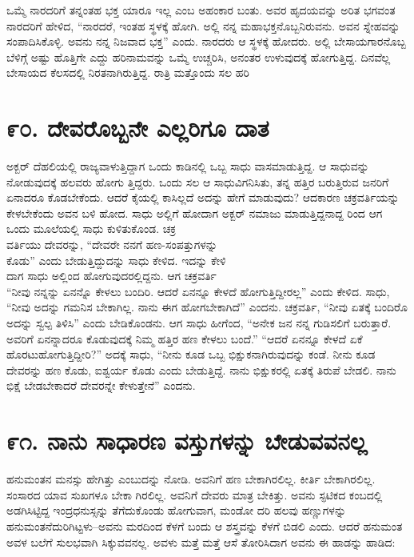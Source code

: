ಒಮ್ಮೆ ನಾರದರಿಗೆ ತನ್ನಂತಹ ಭಕ್ತ ಯಾರೂ ಇಲ್ಲ ಎಂಬ ಅಹಂಕಾರ ಬಂತು. ಅವರ ಹೃದಯವನ್ನು ಅರಿತ ಭಗವಂತ ನಾರದರಿಗೆ ಹೇಳಿದ, “ನಾರದರೆ, ಇಂತಹ ಸ್ಥಳಕ್ಕೆ ಹೋಗಿ. ಅಲ್ಲಿ ನನ್ನ ಮಹಾಭಕ್ತನೊಬ್ಬನಿರುವನು. ಅವನ ಸ್ನೇಹವನ್ನು ಸಂಪಾದಿಸಿಕೊಳ್ಳಿ. ಅವನು ನನ್ನ ನಿಜವಾದ ಭಕ್ತ” ಎಂದು. ನಾರದರು ಆ ಸ್ಥಳಕ್ಕೆ ಹೋದರು. ಅಲ್ಲಿ ಬೇಸಾಯಗಾರನೊಬ್ಬ ಬೆಳಿಗ್ಗೆ ಅಷ್ಟು ಹೊತ್ತಿಗೇ ಎದ್ದು ಹರಿನಾಮವನ್ನು ಒಮ್ಮೆ ಉಚ್ಚರಿಸಿ, ಅನಂತರ ಉಳುವುದಕ್ಕೆ ಹೋಗುತ್ತಿದ್ದ. ದಿನವೆಲ್ಲ ಬೇಸಾಯದ ಕೆಲಸದಲ್ಲಿ ನಿರತನಾಗಿರುತ್ತಿದ್ದ. ರಾತ್ರಿ ಮತ್ತೊಂದು ಸಲ ಹರಿ



\section{\num{೯೦. } ದೇವರೊಬ್ಬನೇ ಎಲ್ಲರಿಗೂ ದಾತ}

ಅಕ್ಬರ್ ದೆಹಲಿಯಲ್ಲಿ ರಾಜ್ಯವಾಳುತ್ತಿದ್ದಾಗ ಒಂದು ಕಾಡಿನಲ್ಲಿ ಒಬ್ಬ ಸಾಧು ವಾಸಮಾಡುತ್ತಿದ್ದ. ಆ ಸಾಧುವನ್ನು ನೋಡುವುದಕ್ಕೆ ಹಲವರು ಹೋಗು ತ್ತಿದ್ದರು. ಒಂದು ಸಲ ಆ ಸಾಧುವಿಗನಿಸಿತು, ತನ್ನ ಹತ್ತಿರ ಬರುತ್ತಿರುವ ಜನರಿಗೆ ಏನಾದರೂ ಕೊಡಬೇಕೆಂದು. ಆದರೆ ಕೈಯಲ್ಲಿ ಕಾಸಿಲ್ಲದೆ ಅದನ್ನು ಹೇಗೆ ಮಾಡುವುದು? ಆದಕಾರಣ ಚಕ್ರವರ್ತಿಯನ್ನು ಕೇಳಬೇಕೆಂದು ಅವನ ಬಳಿ ಹೋದ. ಸಾಧು ಅಲ್ಲಿಗೆ ಹೋದಾಗ ಅಕ್ಬರ್ ನಮಾಜು ಮಾಡುತ್ತಿದ್ದನಾದ್ದ ರಿಂದ ಆಗ ಒಂದು ಮೂಲೆಯಲ್ಲಿ ಸಾಧು ಕುಳಿತುಕೊಂಡ. ಚಕ್ರ\\ವರ್ತಿಯು ದೇವರನ್ನು, “ದೇವರೇ ನನಗೆ ಹಣ-ಸಂಪತ್ತುಗಳನ್ನು\\ಕೊಡು” ಎಂದು ಬೇಡುತ್ತಿದ್ದುದನ್ನು ಸಾಧು ಕೇಳಿದ. ಇದನ್ನು ಕೇಳಿ\\ದಾಗ ಸಾಧು ಅಲ್ಲಿಂದ ಹೋಗುವುದರಲ್ಲಿದ್ದನು. ಆಗ ಚಕ್ರವರ್ತಿ\\“ನೀವು ನನ್ನನ್ನು ಏನನ್ನೊ ಕೇಳಲು ಬಂದಿರಿ. ಆದರೆ ಏನನ್ನೂ ಕೇಳದೆ ಹೋಗುತ್ತಿದ್ದೀರಲ್ಲ” ಎಂದು ಕೇಳಿದ. ಸಾಧು, “ನೀವು ಅದನ್ನು ಗಮನಿಸ ಬೇಕಾಗಿಲ್ಲ. ನಾನು ಈಗ ಹೋಗಬೇಕಾಗಿದೆ” ಎಂದನು. ಚಕ್ರವರ್ತಿ, “ನೀವು ಏತಕ್ಕೆ ಬಂದಿರೊ ಅದನ್ನು ಸ್ವಲ್ಪ ತಿಳಿಸಿ” ಎಂದು ಬೇಡಿಕೊಂಡನು. ಆಗ ಸಾಧು ಹೀಗೆಂದ, “ಅನೇಕ ಜನ ನನ್ನ ಗುಡಿಸಲಿಗೆ ಬರುತ್ತಾರೆ. ಅವರಿಗೆ ಏನನ್ನಾದರೂ ಕೊಡುವುದಕ್ಕೆ ನಿಮ್ಮ ಹತ್ತಿರ ಹಣ ಕೇಳಲು ಬಂದೆ.” “ಆದರೆ ಏನನ್ನೂ ಕೇಳದೆ ಏಕೆ ಹೊರಟುಹೋಗುತ್ತಿದ್ದೀರಿ?” ಅದಕ್ಕೆ ಸಾಧು, “ನೀನು ಕೂಡ ಒಬ್ಬ ಭಿಕ್ಷುಕನಾಗಿರುವುದನ್ನು ಕಂಡೆ. ನೀನು ಕೂಡ ದೇವರನ್ನು ಹಣ ಕೊಡು, ಐಶ್ವರ್ಯ ಕೊಡು ಎಂದು ಬೇಡುತ್ತಿದ್ದೆ. ನಾನು ಭಿಕ್ಷುಕರಲ್ಲಿ ಏತಕ್ಕೆ ತಿರುಪೆ ಬೇಡಲಿ. ನಾನು ಭಿಕ್ಷೆ ಬೇಡಬೇಕಾದರೆ ದೇವರನ್ನೇ ಕೇಳುತ್ತೇನೆ” ಎಂದನು.


\section{\num{೯೧. } ನಾನು ಸಾಧಾರಣ ವಸ್ತುಗಳನ್ನು ಬೇಡುವವನಲ್ಲ}

ಹನುಮಂತನ ಮನಸ್ಸು ಹೇಗಿತ್ತು ಎಂಬುದನ್ನು ನೋಡಿ. ಅವನಿಗೆ ಹಣ ಬೇಕಾಗಿರಲಿಲ್ಲ. ಕೀರ್ತಿ ಬೇಕಾಗಿರಲಿಲ್ಲ. ಸಂಸಾರದ ಯಾವ ಸುಖಗಳೂ ಬೇಕಾ ಗಿರಲಿಲ್ಲ. ಅವನಿಗೆ ದೇವರು ಮಾತ್ರ ಬೇಕಿತ್ತು. ಅವನು ಸ್ಫಟಿಕದ ಕಂಬದಲ್ಲಿ ಅಡಗಿಸಿಟ್ಟಿದ್ದ ಇಂದ್ರಧನುಸ್ಸನ್ನು ತೆಗೆದುಕೊಂಡು ಹೋಗುವಾಗ, ಮಂಡೋ ದರಿ ಹಲವು ಹಣ್ಣುಗಳನ್ನು ಹನುಮಂತನೆದುರಿಗಿಟ್ಟಳು–ಅವನು ಮರದಿಂದ ಕೆಳಗೆ ಬಂದು ಆ ಶಸ್ತ್ರವನ್ನು ಕೆಳಗೆ ಬಿಡಲಿ ಎಂದು. ಆದರೆ ಹನುಮಂತ ಅವಳ ಬಲೆಗೆ ಸುಲಭವಾಗಿ ಸಿಕ್ಕುವವನಲ್ಲ. ಅವಳು ಮತ್ತೆ ಮತ್ತೆ ಆಸೆ ತೋರಿಸಿದಾಗ ಅವನು ಈ ಹಾಡನ್ನು ಹಾಡಿದ:

